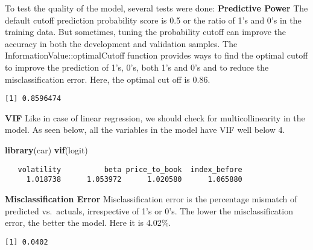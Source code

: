 \documentclass[12pt,twoside]{reedthesis}
\newenvironment{Shaded}{\begin{snugshade}}{\end{snugshade}}
\newcommand{\KeywordTok}[1]{\textcolor[rgb]{0.13,0.29,0.53}{\textbf{{#1}}}}
\newcommand{\DecValTok}[1]{\textcolor[rgb]{0.00,0.00,0.81}{{#1}}}
\newcommand{\StringTok}[1]{\textcolor[rgb]{0.31,0.60,0.02}{{#1}}}
\newcommand{\NormalTok}[1]{{#1}}
\theoremstyle{definition}
\theoremstyle{definition}
\theoremstyle{definition}
\theoremstyle{remark}
\begin{document}
To test the quality of the model, several tests were done: \hfill\break
\textbf{Predictive Power} \hfill\break
The default cutoff prediction probability score is 0.5 or the ratio of
1's and 0's in the training data. But sometimes, tuning the probability
cutoff can improve the accuracy in both the development and validation
samples. The InformationValue::optimalCutoff function provides ways to
find the optimal cutoff to improve the prediction of 1's, 0's, both 1's
and 0's and to reduce the misclassification error. Here, the optimal cut
off is 0.86.
\begin{Shaded}
\end{Shaded}
\begin{verbatim}
[1] 0.8596474
\end{verbatim}
\hfill\break
\textbf{VIF} \hfill\break
Like in case of linear regression, we should check for multicollinearity
in the model. As seen below, all the variables in the model have VIF
well below 4.
\begin{Shaded}
\begin{Highlighting}[]
\KeywordTok{library}\NormalTok{(car)}
\KeywordTok{vif}\NormalTok{(logit)}
\end{Highlighting}
\end{Shaded}
\begin{verbatim}
   volatility          beta price_to_book  index_before 
     1.018738      1.053972      1.020580      1.065880 
\end{verbatim}
\hfill\break
\textbf{Misclassification Error} \hfill\break
Misclassification error is the percentage mismatch of predicted
vs.~actuals, irrespective of 1's or 0's. The lower the misclassification
error, the better the model. Here it is 4.02\%.
\begin{Shaded}
\end{Shaded}
\begin{verbatim}
[1] 0.0402
\end{verbatim}
\end{document}

